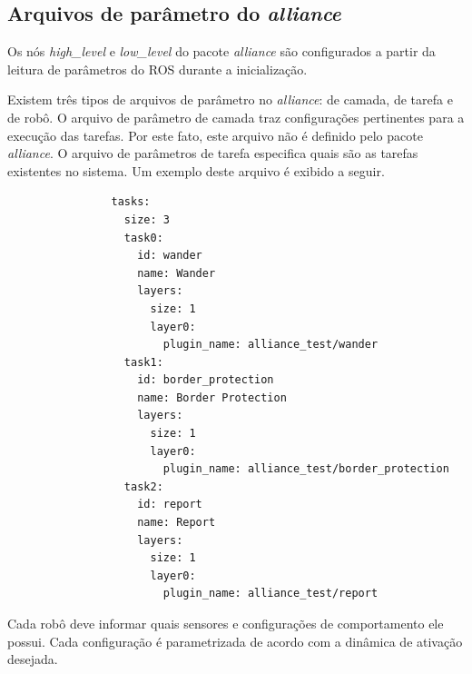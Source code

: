         \subsection{Arquivos de parâmetro do \textit{alliance}} \label{subsec:alliance_config}
            Os nós \textit{high\_level} e \textit{low\_level} do pacote \textit{alliance} são configurados a partir da leitura de parâmetros do ROS durante a inicialização. 
            
            Existem três tipos de arquivos de parâmetro no \textit{alliance}: de camada, de tarefa e de robô. O arquivo de parâmetro de camada traz configurações pertinentes para a execução das tarefas. Por este fato, este arquivo não é definido pelo pacote \textit{alliance}. O arquivo de parâmetros de tarefa especifica quais são as tarefas existentes no sistema. Um exemplo deste arquivo é exibido a seguir.
            
            
            \begin{lstlisting}
                tasks:
                  size: 3
                  task0:
                    id: wander
                    name: Wander
                    layers:
                      size: 1
                      layer0:
                        plugin_name: alliance_test/wander
                  task1:
                    id: border_protection
                    name: Border Protection
                    layers:
                      size: 1
                      layer0:
                        plugin_name: alliance_test/border_protection
                  task2:
                    id: report
                    name: Report
                    layers:
                      size: 1
                      layer0:
                        plugin_name: alliance_test/report
            \end{lstlisting}
            
            Cada robô deve informar quais sensores e configurações de comportamento ele possui. Cada configuração é parametrizada de acordo com a dinâmica de ativação desejada.
            
